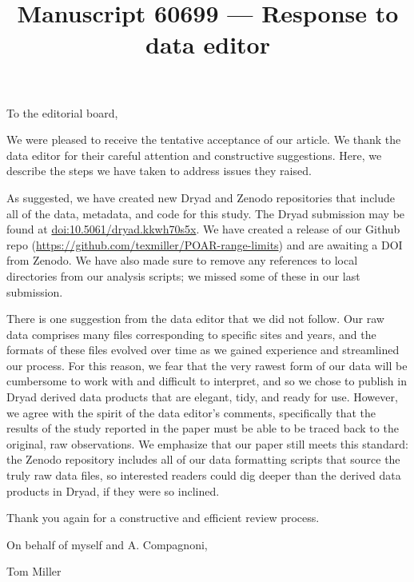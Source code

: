 \documentclass[12pt]{article}
\begin{document}
\title{Manuscript 60699 --- Response to data editor}

\maketitle
\noindent To the editorial board,

We were pleased to receive the tentative acceptance of our article. We thank the data editor for their careful attention and constructive suggestions. Here, we describe the steps we have taken to address issues they raised. 

As suggested, we have created new Dryad and Zenodo repositories that include all of the data, metadata, and code for this study. The Dryad submission may be found at \url{doi:10.5061/dryad.kkwh70s5x}. We have created a release of our Github repo (\url{https://github.com/texmiller/POAR-range-limits}) and are awaiting a DOI from Zenodo. We have also made sure to remove any references to local directories from our analysis scripts; we missed some of these in our last submission. 

There is one suggestion from the data editor that we did not follow. Our raw data comprises many files corresponding to specific sites and years, and the formats of these files evolved over time as we gained experience and streamlined our process. For this reason, we fear that the very rawest form of our data will be cumbersome to work with and difficult to interpret, and so we chose to publish in Dryad derived data products that are elegant, tidy, and ready for use. However, we agree with the spirit of the data editor's comments, specifically that the results of the study reported in the paper must be able to be traced back to the original, raw observations. We emphasize that our paper still meets this standard: the Zenodo repository includes all of our data formatting scripts that source the truly raw data files, so interested readers could dig deeper than the derived data products in Dryad, if they were so inclined. 

Thank you again for a constructive and efficient review process. 

\vspace{2em}
\hfill On behalf of myself and A. Compagnoni,

\hfill Tom Miller
\newpage

\end{document}
